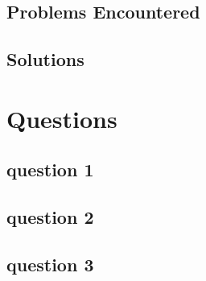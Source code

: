 \documentclass[11pt]{article}
\begin{document}
\subsection*{Problems Encountered}
\subsection*{Solutions}

\section*{Questions}
\subsection*{question 1}
\subsection*{question 2}
\subsection*{question 3}
\end{document}
